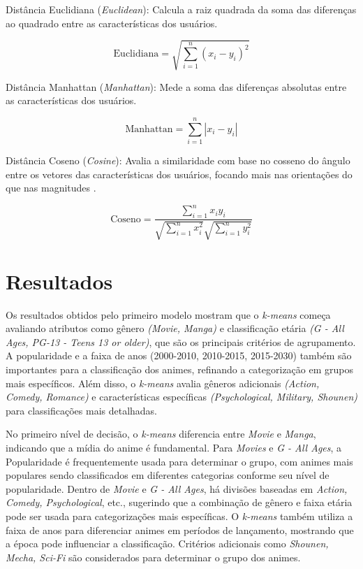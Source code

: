 \documentclass[twocolumn]{rbef}
\newcommand{\1}{\mathbbm{1}}
\begin{document}
Distância Euclidiana (\textit{Euclidean}): Calcula a raiz quadrada da soma das diferenças ao quadrado entre as características dos usuários.

\begin{equation}
\text{Euclidiana} = \sqrt{\sum_{i=1}^{n} (x_i - y_i)^2}
\end{equation}

Distância Manhattan (\textit{Manhattan}): Mede a soma das diferenças absolutas entre as características dos usuários.

\begin{equation}
\text{Manhattan} = \sum_{i=1}^{n} |x_i - y_i|
\end{equation}


Distância Coseno (\textit{Cosine}): Avalia a similaridade com base no cosseno do ângulo entre os vetores das características dos usuários, focando mais nas orientações do que nas magnitudes \cite{Manning}.

\begin{equation}
\text{Coseno} = \frac{\sum_{i=1}^{n} x_i y_i}{\sqrt{\sum_{i=1}^{n} x_i^2} \sqrt{\sum_{i=1}^{n} y_i^2}}
\end{equation}

\section{Resultados} \label{resultados}

Os resultados obtidos pelo primeiro modelo mostram que o \textit{k-means} começa avaliando atributos como gênero \textit{(Movie, Manga)} e classificação etária \textit{(G - All Ages, PG-13 - Teens 13 or older)}, que são os principais critérios de agrupamento. A popularidade e a faixa de anos (2000-2010, 2010-2015, 2015-2030) também são importantes para a classificação dos animes, refinando a categorização em grupos mais específicos. Além disso, o \textit{k-means} avalia gêneros adicionais \textit{(Action, Comedy, Romance)} e características específicas \textit{(Psychological, Military, Shounen)} para classificações mais detalhadas.

No primeiro nível de decisão, o \textit{k-means} diferencia entre \textit{Movie} e \textit{Manga}, indicando que a mídia do anime é fundamental. Para \textit{Movies} e \textit{G - All Ages}, a Popularidade é frequentemente usada para determinar o grupo, com animes mais populares sendo classificados em diferentes categorias conforme seu nível de popularidade. Dentro de \textit{Movie} e \textit{G - All Ages}, há divisões baseadas em \textit{Action, Comedy, Psychological}, etc., sugerindo que a combinação de gênero e faixa etária pode ser usada para categorizações mais específicas. O \textit{k-means} também utiliza a faixa de anos para diferenciar animes em períodos de lançamento, mostrando que a época pode influenciar a classificação. Critérios adicionais como \textit{Shounen, Mecha, Sci-Fi} são considerados para determinar o grupo dos animes.
\end{document}
